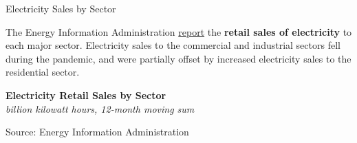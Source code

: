 \documentclass{report}
\makeatletter
\newcommand{\tbllink}[1]{\href{https://raw.githubusercontent.com/bdecon/US-chartbook/master/chartbook/data/#1}{\faTable}}
\newcommand*\short[1]{\expandafter\@gobbletwo\number\numexpr#1\relax}
\newcommand{\absnode}[3]{\node[below right, align=left] at (axis cs: #1,#2) {#3};}
\newcommand{\dateaxisticks}{
		date coordinates in=x, axis line style={draw=none},
		xmax={2024-01-31},
		max space between ticks=40,	    
		xtick={{1990-01-01}, {1992-01-01}, {1994-01-01}, 
			{1996-01-01}, {1998-01-01}, {2000-01-01}, 
			{2002-01-01}, {2004-01-01}, {2006-01-01},
			{2008-01-01}, {2010-01-01}, {2012-01-01}, {2014-01-01},
		    {2016-01-01}, {2018-01-01}, {2020-01-01}, {2022-01-01}, 
		    {2024-01-01}, {2026-01-01}},
		minor xtick={{1989-01-01}, {1991-01-01}, {1993-01-01},
			{1995-01-01}, {1997-01-01}, {1999-01-01}, 
			{2001-01-01}, {2003-01-01}, {2005-01-01}, {2007-01-01},
		    {2009-01-01}, {2011-01-01}, {2013-01-01}, {2015-01-01},
		    {2017-01-01}, {2019-01-01}, {2021-01-01}, {2023-01-01}, 
		    {2025-01-01}, {2027-01-01}},
		enlarge y limits={0.06}, enlarge x limits={0.01},
		xticklabel style={align=center, yshift=-2pt}, tick label style={inner sep=0pt},
		}
\newcommand{\thickline}[4]{\addplot[ultra thick, no markers, color=#1] 
		table [x=#2, y=#3, col sep=comma] {#4};	}
\newcommand{\recbars}{
		\fill[color=black!10] (axis cs:{2007-12-01},\pgfkeysvalueof{/pgfplots/ymin})
			rectangle (axis cs:{2009-07-01}, \pgfkeysvalueof{/pgfplots/ymax});
		\fill[color=black!10] (axis cs:{2020-02-01},\pgfkeysvalueof{/pgfplots/ymin}) 
			rectangle (axis cs:{2020-05-01}, \pgfkeysvalueof{/pgfplots/ymax});}
\makeatother
\begin{document}
{\begin{minipage}{1.0\textwidth}
\small 
\vspace{3mm}

\normalsize Electricity Sales by Sector
\vspace{-0.5mm}

\small The Energy Information Administration \href{https://www.eia.gov/electricity/monthly/}{report} the \textbf{retail sales of electricity} to each major sector. Electricity sales to the commercial and industrial sectors fell during the pandemic, and were partially offset by increased electricity sales to the residential sector. 
\end{minipage}

\begin{minipage}{0.44\textwidth}
\normalsize \textbf{Electricity Retail Sales by Sector}\\
\footnotesize{\textit{billion kilowatt hours, 12-month moving sum}}
\vspace{3.2cm}

\hspace{5mm} 

\footnotesize{Source: Energy Information Administration} \hfill \tbllink{elec_sales.csv}
\end{minipage} \hspace{5mm}
\begin{minipage}{0.28\textwidth}
\small 
\end{minipage}
\newpage
\vspace*{-10mm}

\hypertarget{busrs}{\label{busrs}}
\begin{minipage}{1.0\textwidth}  

\end{minipage}}
\end{document}
